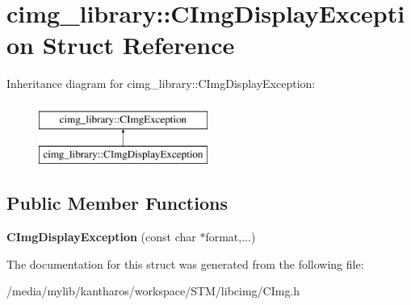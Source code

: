 \hypertarget{structcimg__library_1_1_c_img_display_exception}{
\section{cimg\_\-library::CImgDisplayException Struct Reference}
\label{structcimg__library_1_1_c_img_display_exception}
}
Inheritance diagram for cimg\_\-library::CImgDisplayException:\begin{figure}[H]
\begin{center}
\leavevmode
\includegraphics[height=2.000000cm]{structcimg__library_1_1_c_img_display_exception}
\end{center}
\end{figure}
\subsection*{Public Member Functions}
\begin{DoxyCompactItemize}
\item 
\hypertarget{structcimg__library_1_1_c_img_display_exception_a59ce83ec2cc519ec42391a51512e257c}{
{\bfseries CImgDisplayException} (const char $\ast$format,...)}
\label{structcimg__library_1_1_c_img_display_exception_a59ce83ec2cc519ec42391a51512e257c}

\end{DoxyCompactItemize}


The documentation for this struct was generated from the following file:\begin{DoxyCompactItemize}
\item 
/media/mylib/kantharos/workspace/STM/libcimg/CImg.h\end{DoxyCompactItemize}
